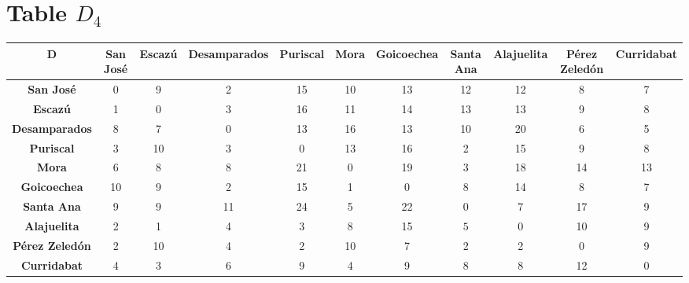 \documentclass{article}
\begin{document}
\section{Table $D_{4}$}
\begin{center}
    \begin{tabular}{|c||c|c|c|c|c|c|c|c|c|c|}
        \hline
        \textbf{D} & \textbf{San José} & \textbf{Escazú} & \textbf{Desamparados} & \textbf{Puriscal} & \textbf{Mora} & \textbf{Goicoechea} & \textbf{Santa Ana} & \textbf{Alajuelita} & \textbf{Pérez Zeledón} & \textbf{Curridabat} \\
        \hline
        \hline
        \textbf{San José}& 0 & 9 & 2 & 15 & 10 & 13 & 12 & 12 & 8 & 7 \\
        \hline
        \textbf{Escazú}& 1 & 0 & 3 & 16 & 11 & 14 & 13 & 13 & 9 & 8 \\
        \hline
        \textbf{Desamparados}& 8 & 7 & 0 & 13 & 16 & 13 & 10 & 20 & 6 & 5 \\
        \hline
        \textbf{Puriscal}& 3 & 10 & 3 & 0 & 13 & 16 & 2 & 15 & 9 & 8 \\
        \hline
        \textbf{Mora}& 6 & 8 & 8 & 21 & 0 & 19 & 3 & 18 & 14 & 13 \\
        \hline
        \textbf{Goicoechea}& 10 & 9 & 2 & 15 & 1 & 0 & 8 & 14 & 8 & 7 \\
        \hline
        \textbf{Santa Ana}& 9 & 9 & 11 & 24 & 5 & 22 & 0 & 7 & 17 & 9 \\
        \hline
        \textbf{Alajuelita}& 2 & 1 & 4 & 3 & 8 & 15 & \cellcolor[HTML]{D74894}$5$ & 0 & 10 & 9 \\
        \hline
        \textbf{Pérez Zeledón}& 2 & 10 & 4 & 2 & 10 & 7 & 2 & 2 & 0 & 9 \\
        \hline
        \textbf{Curridabat}& 4 & 3 & 6 & 9 & 4 & 9 & 8 & 8 & 12 & 0 \\
        \hline
    \end{tabular}
\end{center}
\end{document}
